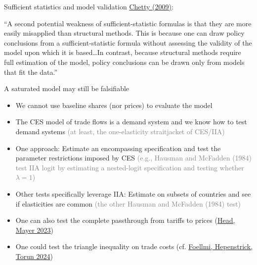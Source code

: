 \documentclass[11pt,notes=hide,aspectratio=169]{beamer}
\begin{document}
\begin{frame}{Sufficient statistics and model validation}
\href{https://doi.org/10.1146/annurev.economics.050708.142910}{Chetty (2009)}:
{``A second potential weakness of sufficient-statistic formulas is that they are more easily misapplied than structural methods. This is because one can draw policy conclusions from a sufficient-statistic formula without assessing the validity of the model upon which it is based\dots In contrast, because structural methods require full estimation of the model, policy conclusions can be drawn only from models that fit the data.''\par}
\end{frame}
\begin{frame}{A saturated model may still be falsifiable}
\begin{itemize}
\item We cannot use baseline shares (nor prices) to evaluate the model
\item The CES model of trade flows is a demand system and we know how to test demand systems
\textcolor{gray}{(at least, the one-elasticity straitjacket of CES/IIA)}
\item One approach: Estimate an encompassing specification and test the parameter restrictions imposed by CES
\textcolor{gray}{(e.g., Hausman and McFadden (1984) test IIA logit by estimating a nested-logit specification and testing whether $\lambda = 1$)}
\item Other tests specifically leverage IIA:
Estimate on subsets of countries and see if elasticities are common
\textcolor{gray}{(the other Hausman and McFadden (1984) test)}
\item One can also test the complete passthrough from tariffs to prices (\href{https://direct.mit.edu/rest/article/doi/10.1162/rest_a_01369/117708/Poor-Substitutes-Counterfactual-Methods-in-IO-and}{Head, Mayer 2023})
\item One could test the triangle inequality on trade costs (cf. \href{https://doi.org/10.1016/j.jinteco.2024.104018}{Foellmi, Hepenstrick, Torun 2024})
\end{itemize}
\end{frame}
\end{document}

